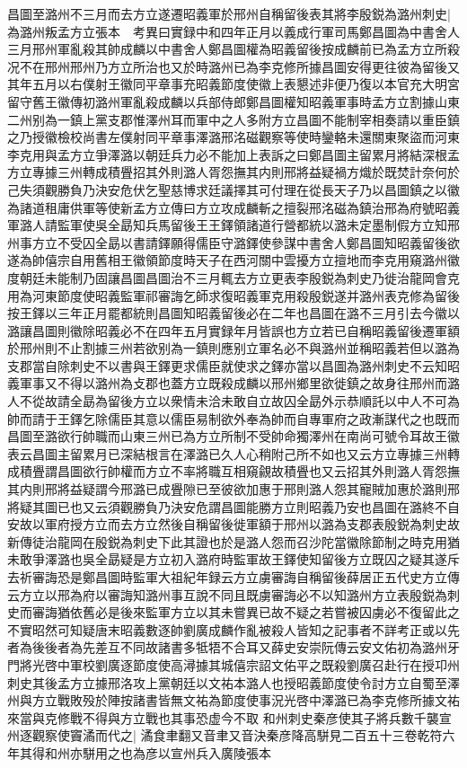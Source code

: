 昌圖至潞州不三月而去方立遂遷昭義軍於邢州自稱留後表其將李殷鋭為潞州刺史|{
	為潞州叛孟方立張本　考異曰實録中和四年正月以義成行軍司馬鄭昌圖為中書舍人三月邢州軍亂殺其帥成麟以中書舍人鄭昌圖權為昭義留後按成麟前已為孟方立所殺况不在邢州邢州乃方立所治也又於時潞州已為李克修所據昌圖安得更往彼為留後又其年五月以右僕射王徽同平章事充昭義節度使徽上表懇述非便乃復以本官充大明宮留守舊王徽傳初潞州軍亂殺成麟以兵部侍郎鄭昌圖權知昭義軍事時孟方立割據山東二州别為一鎮上黨支郡惟澤州耳而軍中之人多附方立昌圖不能制宰相奏請以重臣鎮之乃授徽檢校尚書左僕射同平章事澤潞邢洺磁觀察等使時鑾輅未還關東聚盜而河東李克用與孟方立爭澤潞以朝廷兵力必不能加上表訴之曰鄭昌圖主留累月將結深根孟方立專據三州轉成積舋招其外則潞人胥怨撫其内則邢將益疑禍方熾於既焚計奈何於己失須觀勝負乃決安危伏乞聖慈博求廷議擇其可付理在從長天子乃以昌圖鎮之以徽為諸道租庸供軍等使新孟方立傳曰方立攻成麟斬之擅裂邢洺磁為鎮治邢為府號昭義軍潞人請監軍使吳全勗知兵馬留後王王鐸領諸道行營都統以潞未定墨制假方立知邢州事方立不受囚全勗以書請鐸願得儒臣守潞鐸使參謀中書舍人鄭昌圖知昭義留後欲遂為帥僖宗自用舊相王徽領節度時天子在西河關中雲擾方立擅地而李克用窺潞州徽度朝廷未能制乃固讓昌圖昌圖治不三月輒去方立更表李殷鋭為刺史乃徙治龍岡會克用為河東節度使昭義監軍祁審誨乞師求復昭義軍克用殺殷鋭遂并潞州表克修為留後按王鐸以三年正月罷都統則昌圖知昭義留後必在二年也昌圖在潞不三月引去今徽以潞讓昌圖則徽除昭義必不在四年五月實録年月皆誤也方立若已自稱昭義留後遷軍額於邢州則不止割據三州若欲别為一鎮則應别立軍名必不與潞州並稱昭義若但以潞為支郡當自除刺史不以書與王鐸更求儒臣就使求之鐸亦當以昌圖為潞州刺史不云知昭義軍事又不得以潞州為攴郡也蓋方立既殺成麟以邢州鄉里欲徙鎮之故身往邢州而潞人不從故請全勗為留後方立以衆情未洽未敢自立故囚全勗外示恭順託以中人不可為帥而請于王鐸乞除儒臣其意以儒臣易制欲外奉為帥而自專軍府之政漸謀代之也既而昌圖至潞欲行帥職而山東三州已為方立所制不受帥命獨澤州在南尚可號令耳故王徽表云昌圖主留累月已深結根言在澤潞已久人心稍附己所不如也又云方立專據三州轉成積舋謂昌圖欲行帥權而方立不率將職互相窺覦故積舋也又云招其外則潞人胥怨撫其内則邢將益疑謂今邢潞已成舋隙已至彼欲加惠于邢則潞人怨其寵賊加惠於潞則邢將疑其圖已也又云須觀勝負乃決安危謂昌圖能勝方立則昭義乃安也昌圖在潞終不自安故以軍府授方立而去方立然後自稱留後徙軍額于邢州以潞為支郡表殷鋭為刺史故新傳徒治龍岡在殷鋭為刺史下此其證也於是潞人怨而召沙陀當徽除節制之時克用猶未敢爭澤潞也吳全勗疑是方立初入潞府時監軍故王鐸使知留後方立既囚之疑其遂斥去祈審誨恐是鄭昌圖時監軍大祖紀年録云方立虜審誨自稱留後薛居正五代史方立傳云方立以邢為府以審誨知潞州事互說不同且既虜審誨必不以知潞州方立表殷鋭為刺史而審誨猶依舊必是後來監軍方立以其未嘗異已故不疑之若嘗被囚虜必不復留此之不實昭然可知疑唐末昭義數逐帥劉廣成麟作亂被殺人皆知之記事者不詳考正或以先者為後後者為先差互不同故諸書多牴牾不合耳又薛史安崇阮傳云安文佑初為潞州牙門將光啓中軍校劉廣逐節度使高潯據其城僖宗詔文佑平之既殺劉廣召赴行在授卭州刺史其後孟方立據邢洛攻上黨朝廷以文祐本潞人也授昭義節度使令討方立自蜀至澤州與方立戰敗殁於陣按諸書皆無文祐為節度使事況光啓中澤潞已為李克修所據文祐來當與克修戰不得與方立戰也其事恐虚今不取}
和州刺史秦彦使其子將兵數千襲宣州逐觀察使竇潏而代之|{
	潏食聿翻又音聿又音決秦彦降高駢見二百五十三卷乾符六年其得和州亦駢用之也為彦以宣州兵入廣陵張本}


